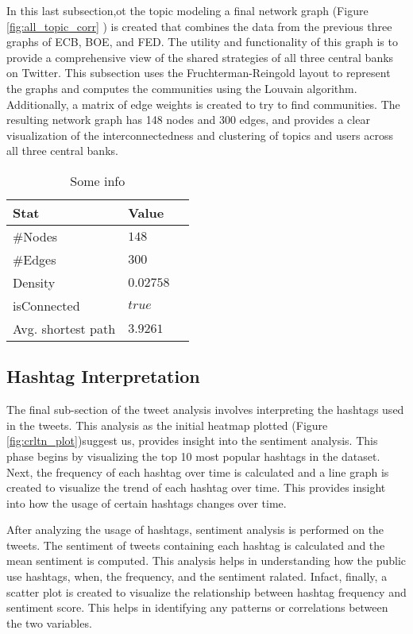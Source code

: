 \documentclass[fleqn,10pt]{SelfArx} %
\begin{document}
In this last subsection,ot the topic modeling a final network graph (Figure \ref{fig:all_topic_corr} ) is created that combines the data from the previous three graphs of ECB, BOE, and FED. The utility and functionality of this graph is to provide a comprehensive view of the shared strategies of all three central banks on Twitter. This subsection uses the Fruchterman-Reingold layout to represent the graphs and computes the communities using the Louvain algorithm. Additionally, a matrix of edge weights is created to try to find communities. The resulting network graph has 148 nodes and 300 edges, and provides a clear visualization of the interconnectedness and clustering of topics and users across all three central banks. 
\begin{table}[hbt]
	\caption{Some info}
	\centering
	\begin{tabular}{llr}
		\toprule
		\cmidrule(r){1-2}
		Stat & Value \\
		\midrule
		#Nodes & $148$ \\
		#Edges  & $300$ \\
		Density  & $0.02758$ \\
		isConnected  & $true$ \\
		Avg. shortest path  & $3.9261$ \\
		\bottomrule
	\end{tabular}
	\label{tab:label}
\end{table}





\subsection{Hashtag Interpretation}

The final sub-section of the tweet analysis involves interpreting the hashtags used in the tweets. This analysis as the initial heatmap plotted (Figure \ref{fig:crltn_plot})suggest us,  provides insight into the sentiment analysis. This phase begins by visualizing the top 10 most popular hashtags in the dataset. Next, the frequency of each hashtag over time is calculated and a line graph is created to visualize the trend of each hashtag over time. This provides insight into how the usage of certain hashtags changes over time.

After analyzing the usage of hashtags, sentiment analysis is performed on the tweets. The sentiment of tweets containing each hashtag is calculated and the mean sentiment is computed. This analysis helps in understanding how the public use hashtags, when, the frequency, and the sentiment ralated. Infact, finally, a scatter plot is created to visualize the relationship between hashtag frequency and sentiment score. This helps in identifying any patterns or correlations between the two variables.
\end{document}

